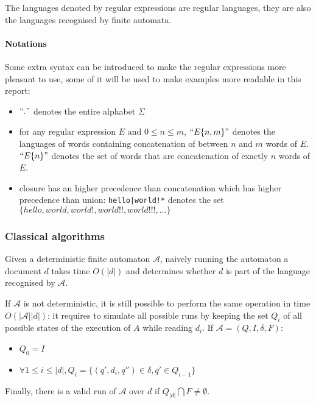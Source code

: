 \documentclass[12px]{article}
\begin{document}
        The languages denoted by regular expressions are regular languages,
        they are also the languages recognised by finite automata.

        \paragraph{Notations} Some extra syntax can be introduced to make the
        regular expressions more pleasant to use, some of it will be used to
        make examples more readable in this report:
        \begin{itemize}
          \item $``."$ denotes the entire alphabet $\Sigma$
          \item for any regular expression $E$ and $0 \leq n \leq m$,
            $``E\{n,m\}"$ denotes the languages of words containing
            concatenation of between $n$ and $m$ words of $E$. $``E\{n\}"$
            denotes the set of words that are concatenation of exactly $n$
            words of $E$.
          \item closure has an higher precedence than concatenation which has
            higher precedence than union: \texttt{hello|world!*} denotes the
            set $\{hello, world, world!, world!!, world!!!, \ldots\}$
        \end{itemize}

      \subsubsection{Classical algorithms}

        Given a deterministic finite automaton $\mathcal{A}$, naively running
        the automaton a document $d$ takes time $O(|d|)$ and determines whether
        $d$ is part of the language recognised by $\mathcal{A}$.

        If $\mathcal{A}$ is not deterministic, it is still possible to perform
        the same operation in time $O(|\mathcal{A}| |d|)$: it requires to
        simulate all possible runs by keeping the set $Q_i$ of all possible
        states of the execution of $A$ while reading $d_i$. If $\mathcal{A} =
        (Q, I, \delta, F)$:
        \begin{itemize}
          \item $Q_0 = I$
          \item $\forall 1 \leq i \leq |d|, Q_i = \{(q', d_i, q'') \in \delta,
            q' \in Q_{i-1}\}$
        \end{itemize}
        Finally, there is a valid run of $\mathcal{A}$ over $d$ if $Q_{|d|}
        \bigcap F \neq \emptyset$.
\end{document}
